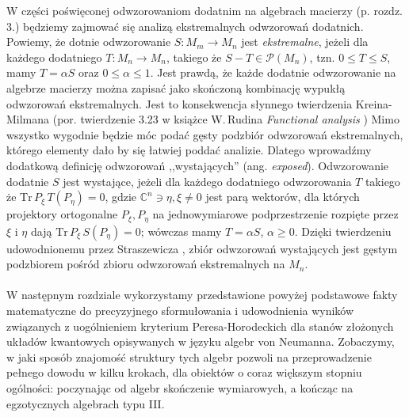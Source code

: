 W części poświęconej odwzorowaniom dodatnim na algebrach macierzy (p. rozdz. 3.)
będziemy zajmować się analizą ekstremalnych odwzorowań dodatnich.
Powiemy, że dotnie odwzorowanie $S: M_{m} \rightarrow M_{n}$ jest \emph{ekstremalne},
jeżeli dla każdego dodatniego $T: M_{n} \rightarrow M_{n}$, takiego że
$S - T \in \mathcal{P}(M_{n})$,
tzn. $0 \leq T \leq S$,
mamy $T = \alpha S$ oraz $0 \leq \alpha \leq 1$.
Jest prawdą, że każde dodatnie odwzorowanie na algebrze macierzy można zapisać
jako skończoną kombinację wypukłą odwzorowań ekstremalnych.
Jest to konsekwencja słynnego twierdzenia Kreina-Milmana
(por. twierdzenie 3.23 w książce W.\,Rudina \emph{Functional analysis}
\cite{Rudin1991})
Mimo wszystko wygodnie będzie móc podać gęsty podzbiór odwzorowań ekstremalnych,
którego elementy dało by się łatwiej poddać analizie.
Dlatego wprowadźmy dodatkową definicję odwzorowań ,,wystających''
(ang. \emph{exposed}).
Odwzorowanie dodatnie $S$ jest wystające, jeżeli dla każdego dodatniego odwzorowania
$T$ takiego że
$\text{Tr}\, P_{\xi} \, T(P_{\eta}) = 0$,
gdzie
$\mathbb{C}^{n} \ni \eta, \xi \neq 0$ jest parą wektorów,
dla których projektory ortogonalne $P_{\xi}, P_{\eta}$ na jednowymiarowe
podprzestrzenie rozpięte przez $\xi$ i $\eta$ dają
$\text{Tr}\, P_{\xi} \, S(P_{\eta}) = 0$;
wówczas mamy $T = \alpha S$, $\alpha \geq 0$.
Dzięki twierdzeniu udowodnionemu przez Straszewicza \cite{straszewicz1935exponierte},
zbiór odwzorowań wystających jest gęstym podzbiorem pośród zbioru odwzorowań
ekstremalnych na $M_{n}$.

\paragraph{}
W następnym rozdziale wykorzystamy przedstawione powyżej podstawowe fakty
matematyczne do precyzyjnego sformułowania i udowodnienia wyników związanych
z uogólnieniem kryterium Peresa-Horodeckich dla stanów złożonych układów
kwantowych opisywanych w języku algebr von Neumanna.
Zobaczymy,
w jaki sposób znajomość struktury tych algebr pozwoli na przeprowadzenie
pełnego dowodu w kilku krokach, dla obiektów o coraz większym stopniu ogólności:
poczynając od algebr skończenie wymiarowych,
a kończąc na egzotycznych algebrach typu III.
